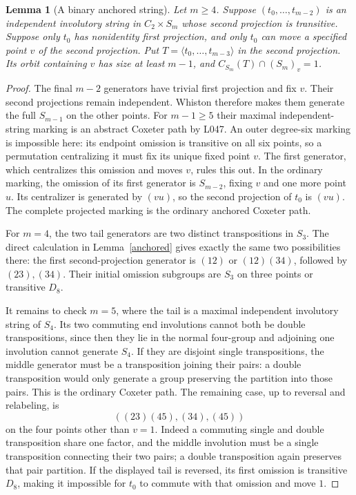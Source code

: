 \documentclass[11pt,a4paper]{article}
\newtheorem{lemma}{Lemma}
\newcommand{\gen}[1]{\langle#1\rangle}
\begin{document}
\begin{lemma}[A binary anchored string]\label{binary-anchor}
Let $m\geq4$. Suppose $(t_0,\ldots,t_{m-2})$ is an independent
involutory string in $C_2\times S_m$ whose second projection is
transitive. Suppose only $t_0$ has nonidentity first projection,
and only $t_0$ can move a specified point $v$ of the second
projection. Put $T=\gen{t_0,\ldots,t_{m-3}}$ in the second
projection. Its orbit containing $v$ has size at least $m-1$,
and $C_{S_m}(T)\cap(S_m)_v=1$.
\end{lemma}
\begin{proof}
The final $m-2$ generators have trivial first projection and
fix $v$. Their second projections remain independent. Whiston
therefore makes them generate the full $S_{m-1}$ on the other
points. For $m-1\geq5$ their maximal independent-string marking
is an abstract Coxeter path by L047. An outer degree-six marking
is impossible here: its endpoint omission is transitive on all
six points, so a permutation centralizing it must fix its unique
fixed point $v$. The first generator, which centralizes this
omission and moves $v$, rules this out. In the ordinary marking,
the omission of its first generator is $S_{m-2}$, fixing $v$
and one more point $u$. Its centralizer is generated by $(vu)$,
so the second projection of $t_0$ is $(vu)$. The complete
projected marking is the ordinary anchored Coxeter path.

For $m=4$, the two tail generators are two distinct
transpositions in $S_3$. The direct calculation in
Lemma~\ref{anchored} gives exactly the same two possibilities
there: the first second-projection generator is $(12)$ or
$(12)(34)$, followed by $(23),(34)$. Their initial omission
subgroups are $S_3$ on three points or transitive $D_8$.

It remains to check $m=5$, where the tail is a maximal
independent involutory string of $S_4$. Its two commuting end
involutions cannot both be double transpositions, since then
they lie in the normal four-group and adjoining one involution
cannot generate $S_4$. If they are disjoint single
transpositions, the middle generator must be a transposition
joining their pairs: a double transposition would only generate
a group preserving the partition into those pairs. This is the
ordinary Coxeter path. The remaining case, up to reversal and
relabeling, is
\[
 ((23)(45),(34),(45))
\]
on the four points other than $v=1$. Indeed a commuting single
and double transposition share one factor, and the middle
involution must be a single transposition connecting their two
pairs; a double transposition again preserves that pair partition.
If the displayed tail is reversed, its first omission is
transitive $D_8$, making it impossible for $t_0$ to commute
with that omission and move $1$.


\end{proof}
\end{document}
